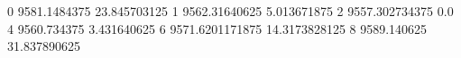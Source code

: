 0 9581.1484375 23.845703125
1 9562.31640625 5.013671875
2 9557.302734375 0.0
4 9560.734375 3.431640625
6 9571.6201171875 14.3173828125
8 9589.140625 31.837890625
